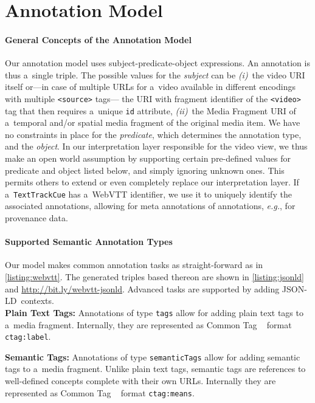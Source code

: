\documentclass{sig-alternate}
\newcommand{\inlinelistingsize}{\fontsize{8pt}{11pt}}
\let\oldurl\url
\renewcommand{\url}[1]{\inlinelistingsize\oldurl{#1}}
\def\JSONLD{\mbox{JSON-LD}}
\begin{document}
\section{Annotation Model}

\paragraph{General Concepts of the Annotation Model}

Our annotation model uses subject-predicate-object expressions.
An annotation is thus a~single triple.
The possible values for the \emph{subject} can be \emph{(i)}~the video
URI itself or---in case of multiple URLs for a~video available
in different encodings with multiple \texttt{<source>} tags---%
the URI with fragment identifier of the \texttt{<video>} tag
that then requires a~unique \texttt{id} attribute,
\emph{(ii)}~the Media Fragment URI of a~temporal and/or spatial
media fragment of the original media item.
We have no constraints in place for the \emph{predicate},
which determines the annotation type, and the \emph{object}.
In our interpretation layer responsible for the video view,
we thus make an open world assumption
by supporting certain pre-defined values for predicate and object
listed below, and simply ignoring unknown ones.
This permits others to extend or even completely replace
our interpretation layer.
If a~\texttt{TextTrackCue} has a~WebVTT identifier,
we use it to uniquely identify the associated annotations,
allowing for meta annotations of annotations, \emph{e.g.},
for provenance data.

\paragraph{Supported Semantic Annotation Types}

Our model makes common annotation tasks as
straight-forward as in \autoref{listing:webvtt}.
The generated triples based thereon are shown in
\autoref{listing:jsonld} and \url{http://bit.ly/webvtt-jsonld}.
Advanced tasks are supported by adding \JSONLD~contexts.\\

\noindent \textbf{Plain Text Tags:} Annotations of type
  \texttt{tags} allow for add\-ing plain text tags
  to a~media fragment.
  Internally, they are represented as Common Tag%
  ~\cite{commontag2009spec} format \texttt{ctag:label}.

\noindent \textbf{Semantic Tags:} Annotations of type
  \texttt{semanticTags} allow for adding semantic tags
  to a~media fragment.
  Unlike plain text tags, semantic tags are references to
  well-defined concepts complete with their own URLs.
  Internally they are represented as Common Tag%
  ~\cite{commontag2009spec} format \texttt{ctag:means}.
\end{document}
